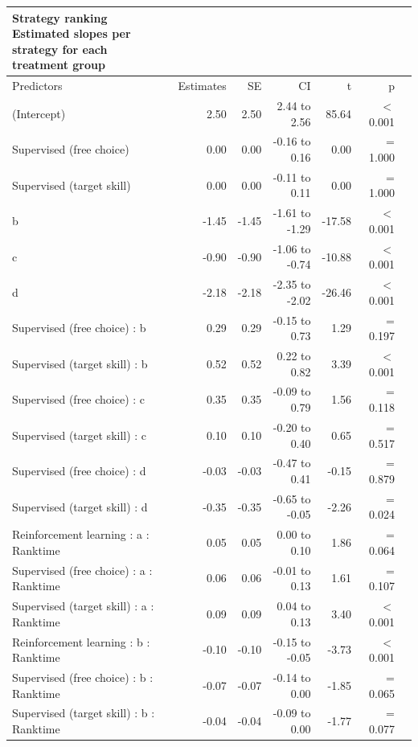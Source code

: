 \documentclass{article}
\begin{document}
\setlength{\LTpost}{0mm}
\begin{longtable}{lrrrrrl}\label{suptable_strategyranking_strategiesslope}
\caption*{
{\large Strategy ranking} \\ 
{\small Estimated slopes per strategy for each treatment group}
} \\ 
\toprule
Predictors & Estimates & SE & CI & t & p \\ 
\midrule\addlinespace[2.5pt]
(Intercept) & 2.50 & 2.50 & 2.44 to 2.56 & 85.64 &  $<$  0.001 \\ 
Supervised (free choice) & 0.00 & 0.00 & -0.16 to 0.16 & 0.00 &  =  1.000 \\ 
Supervised (target skill)  & 0.00 & 0.00 & -0.11 to 0.11 & 0.00 &  =  1.000 \\ 
b & -1.45 & -1.45 & -1.61 to -1.29 & -17.58 &  $<$  0.001 \\ 
c  & -0.90 & -0.90 & -1.06 to -0.74 & -10.88 &  $<$  0.001 \\ 
d & -2.18 & -2.18 & -2.35 to -2.02 & -26.46 &  $<$  0.001 \\ 
Supervised (free choice) : b & 0.29 & 0.29 & -0.15 to 0.73 & 1.29 &  =  0.197 \\ 
Supervised (target skill) : b & 0.52 & 0.52 & 0.22 to 0.82 & 3.39 &  $<$  0.001 \\ 
Supervised (free choice) : c & 0.35 & 0.35 & -0.09 to 0.79 & 1.56 &  =  0.118 \\ 
Supervised (target skill)  : c & 0.10 & 0.10 & -0.20 to 0.40 & 0.65 &  =  0.517 \\ 
Supervised (free choice) : d & -0.03 & -0.03 & -0.47 to 0.41 & -0.15 &  =  0.879 \\ 
Supervised (target skill)  : d & -0.35 & -0.35 & -0.65 to -0.05 & -2.26 &  =  0.024 \\ 
Reinforcement learning : a : Ranktime & 0.05 & 0.05 & 0.00 to 0.10 & 1.86 &  =  0.064 \\ 
Supervised (free choice) : a : Ranktime & 0.06 & 0.06 & -0.01 to 0.13 & 1.61 &  =  0.107 \\ 
Supervised (target skill) : a : Ranktime & 0.09 & 0.09 & 0.04 to 0.13 & 3.40 &  $<$  0.001 \\ 
Reinforcement learning : b : Ranktime & -0.10 & -0.10 & -0.15 to -0.05 & -3.73 &  $<$  0.001 \\ 
Supervised (free choice) : b : Ranktime & -0.07 & -0.07 & -0.14 to 0.00 & -1.85 &  =  0.065 \\ 
Supervised (target skill) : b : Ranktime & -0.04 & -0.04 & -0.09 to 0.00 & -1.77 &  =  0.077 \\ 

\end{longtable}
\end{document}
